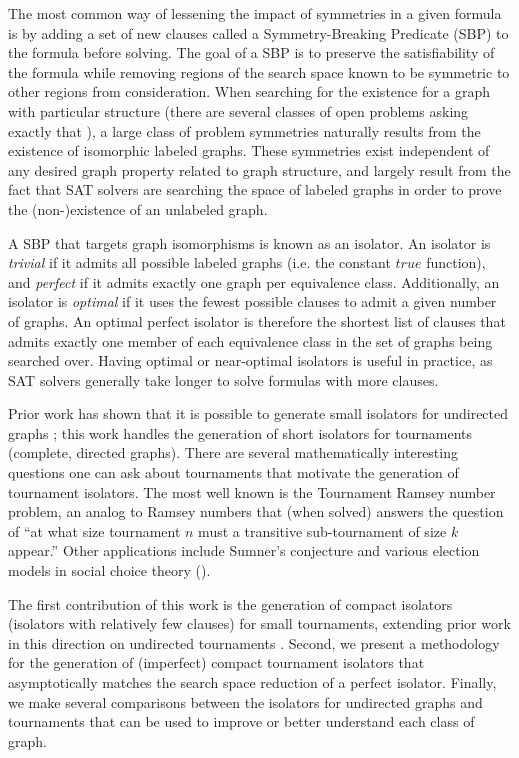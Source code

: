\documentclass[conference]{IEEEtran}
\begin{document}
The most common way of lessening the impact of symmetries in a given formula is by adding a set of new clauses called a Symmetry-Breaking Predicate (SBP) to the formula before solving. The goal of a SBP is to preserve the satisfiability of the formula while removing regions of the search space known to be symmetric to other regions from consideration. When searching for the existence for a graph with particular structure (there are several classes of open problems asking exactly that \cite{ref_vdw, ref_ramseyk, ref_5cycle}), a large class of problem symmetries naturally results from the existence of isomorphic labeled graphs. These symmetries exist independent of any desired graph property related to graph structure, and largely result from the fact that SAT solvers are searching the space of labeled graphs in order to prove the (non-)existence of an unlabeled graph. 

A SBP that targets graph isomorphisms is known as an isolator. An isolator is \emph{trivial} if it admits all possible labeled graphs (i.e. the constant $true$ function), and \emph{perfect} if it admits exactly one graph per equivalence class. Additionally, an isolator is \emph{optimal} if it uses the fewest possible clauses to admit a given number of graphs. An optimal perfect isolator is therefore the shortest list of clauses that admits exactly one member of each equivalence class in the set of graphs being searched over. Having optimal or near-optimal isolators is useful in practice, as SAT solvers generally take longer to solve formulas with more clauses.

Prior work has shown that it is possible to generate small isolators for undirected graphs \cite{ref_heule}; this work handles the generation of short isolators for tournaments (complete, directed graphs). There are several mathematically interesting questions one can ask about tournaments that motivate the generation of tournament isolators. The most well known is the Tournament Ramsey number problem, an analog to Ramsey numbers that (when solved) answers the question of ``at what size tournament $n$ must a transitive sub-tournament of size $k$ appear.'' Other applications include Sumner's conjecture and various election models in social choice theory (\cite{ref_sumner, ref_social_choice}).

The first contribution of this work is the generation of compact isolators (isolators with relatively few clauses) for small tournaments, extending prior work in this direction on undirected tournaments \cite{ref_heule}. Second, we present a methodology for the generation of (imperfect) compact tournament isolators that asymptotically matches the search space reduction of a perfect isolator. Finally, we make several comparisons between the isolators for undirected graphs and tournaments that can be used to improve or better understand each class of graph.
\end{document}
